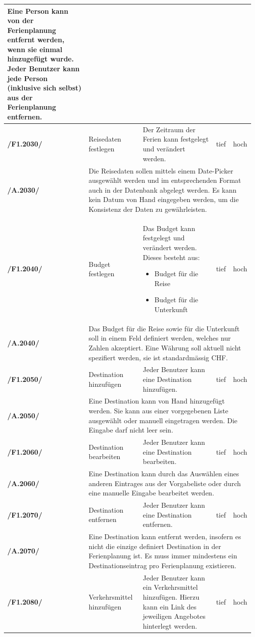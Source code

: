 \documentclass[10pt,a4paper,titlepage,twoside,german,final]{zhawreprt}
\newcommand{\AddRequirement}[2]{
\textbf{/#1#2/}
}
\newcommand{\F}[1]{
\AddRequirement{F1.}{#1}
}
\newcommand{\A}[1]{
\AddRequirement{A.}{#1}
}
\numberwithin{table}{chapter}
\begin{document}
\begin{center}
\begin{longtable}{l|p{2.5cm}|p{5cm}|p{2cm}|p{1.5cm}}
{Eine Person kann von der Ferienplanung entfernt werden, wenn sie einmal hinzugefügt wurde. Jeder Benutzer kann jede Person (inklusive sich selbst) aus der Ferienplanung entfernen.}\\\hline
\F{2030} & Reisedaten festlegen & Der Zeitraum der Ferien kann festgelegt und verändert werden. & tief & hoch\\\hline
\A{2030}&\multicolumn{4}{p{10cm}|}{
Die Reisedaten sollen mittels einem Date-Picker ausgewählt werden und im entsprechenden Format auch in der Datenbank abgelegt werden. Es kann kein Datum von Hand eingegeben werden, um die Konsistenz der Daten zu gewährleisten.}\\\hline
\F{2040} & Budget festlegen & Das Budget kann festgelegt und verändert werden. Dieses besteht aus:
\begin{itemize}
\item Budget für die Reise
\item Budget für die Unterkunft
\end{itemize}
& tief & hoch\\\hline
\A{2040}&\multicolumn{4}{p{10cm}|}{
Das Budget für die Reise sowie für die Unterkunft soll in einem Feld definiert werden, welches nur Zahlen akzeptiert. Eine Währung soll aktuell nicht spezifiert werden, sie ist standardmässig CHF.}\\\hline
\F{2050} & Destination hinzufügen & Jeder Benutzer kann eine Destination hinzufügen. & tief & hoch\\\hline
\A{2050}&\multicolumn{4}{p{10cm}|}{
Eine Destination kann von Hand hinzugefügt werden. Sie kann aus einer vorgegebenen Liste ausgewählt oder manuell eingetragen werden. Die Eingabe darf nicht leer sein.}\\\hline
\F{2060} & Destination bearbeiten & Jeder Benutzer kann eine Destination bearbeiten. & tief & hoch\\\hline
\A{2060}&\multicolumn{4}{p{10cm}|}{
Eine Destination kann durch das Auswählen eines anderen Eintrages aus der Vorgabeliste oder durch eine manuelle Eingabe bearbeitet werden.}\\\hline
\F{2070} & Destination entfernen & Jeder Benutzer kann eine Destination entfernen. & tief & hoch\\\hline
\A{2070}&\multicolumn{4}{p{10cm}|}{
Eine Destination kann entfernt werden, insofern es nicht die einzige definiert Destination in der Ferienplanung ist. Es muss immer mindestens ein Destinationseintrag pro Ferienplanung existieren.}\\\hline
\F{2080} & Verkehrsmittel hinzufügen & Jeder Benutzer kann ein Verkehrsmittel hinzufügen. Hierzu kann ein Link des jeweiligen Angebotes hinterlegt werden. & tief & hoch\\\hline

\end{longtable}
\end{center}
\end{document}
